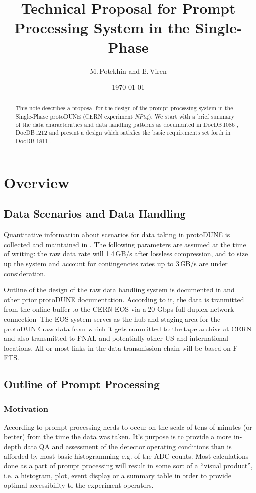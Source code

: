 \documentclass[pdftex,12pt,letter]{article}
\title{Technical Proposal for Prompt Processing System in the Single-Phase \pd}
\date{\today}
\author{M.\,Potekhin and B.\,Viren}
\newcommand{\pd}{protoDUNE\xspace}
\newcommand{\expname}{\textit{NP04}\xspace}
\begin{document}
\maketitle

\begin{abstract}
\noindent  This note describes a proposal for the design of
the prompt processing system in the Single-Phase \pd
(CERN experiment \expname). We start with a brief summary of the data characteristics and data handling patterns
as documented in DocDB\,1086 \cite{docdb1086}, DocDB\,1212 \cite{docdb1212} and present a design which
satisfies the basic requirements set forth in  DocDB 1811 \cite{docdb1811}.
\end{abstract}

\section{Overview}
\subsection{Data Scenarios and Data Handling}
\label{sec:rawdata}
Quantitative information about scenarios for data taking in \pd is collected and maintained in \cite{docdb1086}. The following parameters
are assumed at the time of writing: the raw data rate will 1.4\,GB/s after lossless compression, and to size up
the system and account for contingencies rates up to 3\,GB/s are under consideration.

Outline of the design of the raw data handling system is documented in  \cite{docdb1212} and other prior \pd documentation.
According to it, the data is tranmitted from the online buffer to the CERN EOS via a 20 Gbps full-duplex network connection.
The EOS system serves as the hub and staging area for the \pd raw data from which
it gets committed to the tape archive at CERN and also transmitted to FNAL and potentially
other US and international locations. All or most links in the data transmission chain will be based on F-FTS.

\subsection{Outline of Prompt Processing}
\label{sec:outline}
\subsubsection{Motivation}
According to \cite{docdb1811}  prompt processing needs to occur on the scale
of tens of minutes (or better) from the time the data was taken. It's purpose is to
provide a more in-depth data QA and assessment of the detector operating conditions
than is afforded by most basic histogramming e.g. of the ADC counts. Most calculations
done as a part of prompt processing will result in some sort of a ``visual product'', i.e. a histogram,
plot, event display or a summary table in order to provide optimal accessibility to the experiment
operators.
\end{document}
